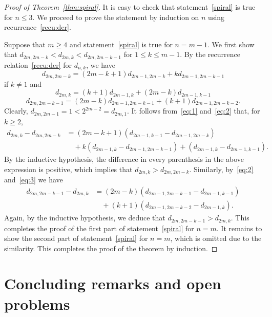 \documentclass[12pt]{amsart}
\numberwithin{equation}{section}
\theoremstyle{plain}
\theoremstyle{definition}
\begin{document}
 \begin{proof}[Proof of Theorem~\ref{thm:spiral}]
  It is easy to check that statement~\eqref{spiral} is true for $n\leq 3$. We proceed to prove the statement by induction on $n$ using recurrence~\eqref{recu:der}.
 
 Suppose that $m\geq4$ and statement~\eqref{spiral} is true for $n=m-1$. We first show that $d_{2m,2m-k}<d_{2m,k}< d_{2m,2m-k-1}$ for $1\leq k\leq m-1$. By the recurrence relation~\eqref{recu:der} for $d_{n,k}$, we have
 \begin{equation}\label{eq:1}
 d_{2m,2m-k}=(2m-k+1)d_{2m-1,2m-k}+kd_{2m-1,2m-k-1}
 \end{equation}
 if $k\neq1$ and
  \begin{equation}\label{eq:2}
 d_{2m,k}=(k+1)d_{2m-1,k}+(2m-k)d_{2m-1,k-1}
 \end{equation}
  \begin{equation}\label{eq:3}
 d_{2m,2m-k-1}=(2m-k)d_{2m-1,2m-k-1}+(k+1)d_{2m-1,2m-k-2}.
 \end{equation}
 Clearly, $d_{2m,2m-1}=1<2^{2m-2}=d_{2m,1}$. It follows from~\eqref{eq:1} and~\eqref{eq:2} that, for $k\geq2$, 
 \begin{align*}
 d_{2m,k}-d_{2m,2m-k}&=(2m-k+1)(d_{2m-1,k-1}-d_{2m-1,2m-k})\\
 &\quad+k(d_{2m-1,k}-d_{2m-1,2m-k-1})+(d_{2m-1,k}-d_{2m-1,k-1}).
 \end{align*}
 By the inductive hypothesis, the difference in every parenthesis in the above expression is positive, which implies that $d_{2m,k}>d_{2m,2m-k}$. Similarly, by~\eqref{eq:2} and~\eqref{eq:3} we have
 \begin{align*}
 d_{2m,2m-k-1}-d_{2m,k}&=(2m-k)(d_{2m-1,2m-k-1}-d_{2m-1,k-1})\\
 &\quad+(k+1)(d_{2m-1,2m-k-2}-d_{2m-1,k}).
 \end{align*}
 Again, by the inductive hypothesis, we deduce that $d_{2m,2m-k-1}>d_{2m,k}$. This completes the proof of the first part of statement~\eqref{spiral} for $n=m$. 
 It remains to show the second part of statement~\eqref{spiral} for $n=m$, which is omitted due to the  similarity. This completes the proof of the theorem by induction. 
 \end{proof}
 
 
 
 


\section{Concluding remarks and open problems}\label{sec:gessel}
\end{document}
